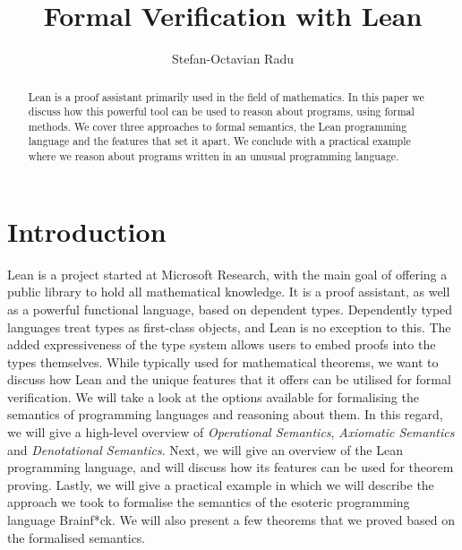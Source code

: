 \documentclass[runningheads]{llncs}
\begin{document}
%
\title{Formal Verification with Lean}
%
%
\author{Stefan-Octavian Radu}
%
%
%
\maketitle              %
%
\begin{abstract} Lean is a proof assistant primarily used in the field of
    mathematics. In this paper we discuss how this powerful tool can be used to
    reason about programs, using formal methods. We cover three approaches to
    formal semantics, the Lean programming language and the features that set
    it apart. We conclude with a practical example where we reason about
    programs written in an unusual programming language.



\end{abstract}

\section{Introduction}

Lean is a project started at Microsoft Research, with the main goal of offering
a public library to hold all mathematical knowledge. It is a proof assistant,
as well as a powerful functional language, based on dependent types.
Dependently typed languages treat types as first-class objects, and Lean is no
exception to this. The added expressiveness of the type system allows users to
embed proofs into the types themselves. While typically used for mathematical
theorems, we want to discuss how Lean and the unique features that it offers
can be utilised for formal verification. We will take a look at the options
available for formalising the semantics of programming languages and reasoning
about them. In this regard, we will give a high-level overview of
\emph{Operational Semantics}, \emph{Axiomatic Semantics} and \emph{Denotational
Semantics}. Next, we will give an overview of the Lean programming language,
and will discuss how its features can be used for theorem proving. Lastly, we
will give a practical example in which we will describe the approach we took to
formalise the semantics of the esoteric programming language Brainf*ck. We will
also present a few theorems that we proved based on the formalised semantics.
\end{document}
